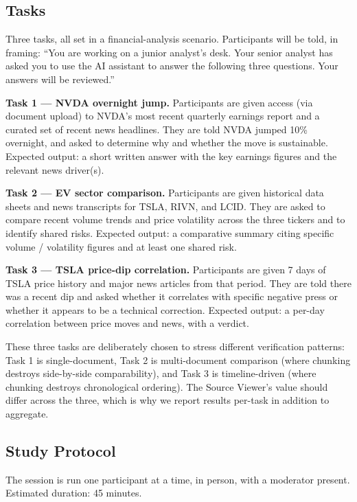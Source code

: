 \subsection{Tasks}

Three tasks, all set in a financial-analysis scenario. Participants will be told, in framing: ``You are working on a junior analyst's desk. Your senior analyst has asked you to use the AI assistant to answer the following three questions. Your answers will be reviewed.''

\textbf{Task 1 --- NVDA overnight jump.} Participants are given access (via document upload) to NVDA's most recent quarterly earnings report and a curated set of recent news headlines. They are told NVDA jumped 10\% overnight, and asked to determine why and whether the move is sustainable. Expected output: a short written answer with the key earnings figures and the relevant news driver(s).

\textbf{Task 2 --- EV sector comparison.} Participants are given historical data sheets and news transcripts for TSLA, RIVN, and LCID. They are asked to compare recent volume trends and price volatility across the three tickers and to identify shared risks. Expected output: a comparative summary citing specific volume / volatility figures and at least one shared risk.

\textbf{Task 3 --- TSLA price-dip correlation.} Participants are given 7 days of TSLA price history and major news articles from that period. They are told there was a recent dip and asked whether it correlates with specific negative press or whether it appears to be a technical correction. Expected output: a per-day correlation between price moves and news, with a verdict.

These three tasks are deliberately chosen to stress different verification patterns: Task 1 is single-document, Task 2 is multi-document comparison (where chunking destroys side-by-side comparability), and Task 3 is timeline-driven (where chunking destroys chronological ordering). The Source Viewer's value should differ across the three, which is why we report results per-task in addition to aggregate.

\subsection{Study Protocol}

The session is run one participant at a time, in person, with a moderator present. Estimated duration: 45 minutes.

